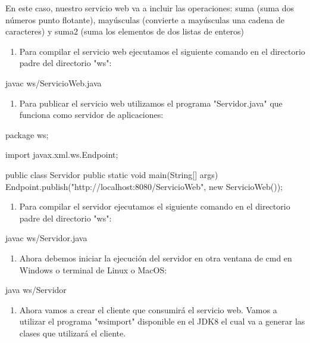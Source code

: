 En este caso, nuestro servicio web va a incluir las operaciones: suma (suma dos números punto flotante), mayúsculas (convierte a mayúsculas una cadena de caracteres) y suma2 (suma los elementos de dos listas de enteros)

\begin{enumerate}
\item Para compilar el servicio web ejecutamos el siguiente comando en el directorio padre del directorio "ws":
\end{enumerate}

\begin{SourceCode}
javac ws/ServicioWeb.java
\end{SourceCode}

\begin{enumerate}
\item Para publicar el servicio web utilizamos el programa "Servidor.java" que funciona como servidor de aplicaciones:
\end{enumerate}

\begin{SourceCode}
package ws;

import javax.xml.ws.Endpoint;

public class Servidor {
public static void main(String[] args) {
Endpoint.publish("http://localhost:8080/ServicioWeb", new ServicioWeb());
}
}
\end{SourceCode}

\begin{enumerate}
\item Para compilar el servidor ejecutamos el siguiente comando en el directorio padre del directorio "ws":
\end{enumerate}

\begin{SourceCode}
javac ws/Servidor.java
\end{SourceCode}

\begin{enumerate}
\item Ahora debemos iniciar la ejecución del servidor en otra ventana de cmd en Windows o terminal de Linux o MacOS:
\end{enumerate}

\begin{SourceCode}
java ws/Servidor
\end{SourceCode}

\begin{enumerate}
\item Ahora vamos a crear el cliente que consumirá el servicio web. Vamos a utilizar el programa "wsimport" disponible en el JDK8 el cual va a generar las clases que utilizará el cliente.
\end{enumerate}

